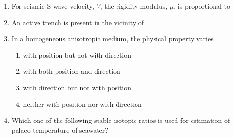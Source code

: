 \documentclass[journal,12pt,onecolumn]{IEEEtran}
\theoremstyle{remark}
\begin{document}
\begin{enumerate}
        \item For seismic S-wave velocity, $V$, the rigidity modulus, $\mu$, is proportional to \hfill{}
            \begin{enumerate}
            \end{enumerate}

        \item An active trench is present in the vicinity of \hfill{}
            \begin{enumerate}
            \end{enumerate}

        \item In a homogeneous anisotropic medium, the physical property varies \hfill{}
            \begin{enumerate}
                    \item with position but not with direction
                    \item with both position and direction
                    \item with direction but not with position
                    \item neither with position nor with direction
            \end{enumerate}
        \item Which one of the following stable isotopic ratios is used for estimation of palaeo-temperature of seawater? \hfill{}
            \begin{enumerate}
            \end{enumerate}


\end{enumerate}
\end{document}
